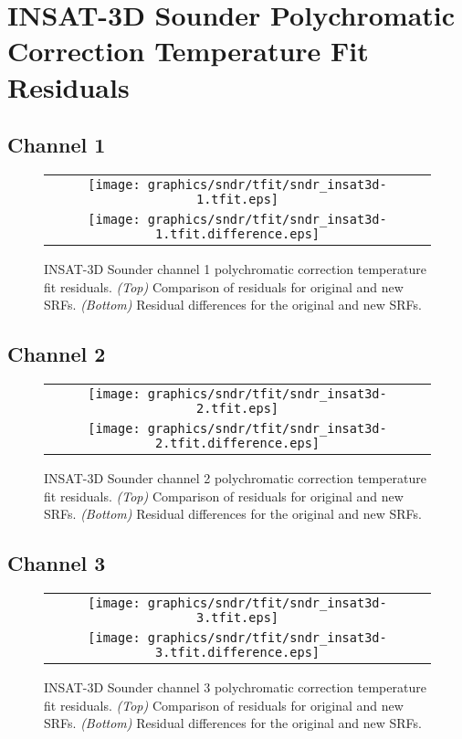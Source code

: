 \section{INSAT-3D Sounder Polychromatic Correction Temperature Fit Residuals}
\label{app.sndr_tfit_data_plots}

\subsection{Channel 1}
\begin{figure}[H]
  \label{fig:sndr_ch1_tfit}
  \centering
  \begin{tabular}{c}
    \texttt{[image: graphics/sndr/tfit/sndr\_insat3d-1.tfit.eps]} \\
    \texttt{[image: graphics/sndr/tfit/sndr\_insat3d-1.tfit.difference.eps]}
  \end{tabular}
  \caption{INSAT-3D Sounder channel 1 polychromatic correction temperature fit residuals. \emph{(Top)} Comparison of residuals for original and new SRFs. \emph{(Bottom)} Residual differences for the original and new SRFs.}
\end{figure}

\subsection{Channel 2}
\begin{figure}[H]
  \label{fig:sndr_ch2_tfit}
  \centering
  \begin{tabular}{c}
    \texttt{[image: graphics/sndr/tfit/sndr\_insat3d-2.tfit.eps]} \\
    \texttt{[image: graphics/sndr/tfit/sndr\_insat3d-2.tfit.difference.eps]}
  \end{tabular}
  \caption{INSAT-3D Sounder channel 2 polychromatic correction temperature fit residuals. \emph{(Top)} Comparison of residuals for original and new SRFs. \emph{(Bottom)} Residual differences for the original and new SRFs.}
\end{figure}

\subsection{Channel 3}
\begin{figure}[H]
  \label{fig:sndr_ch3_tfit}
  \centering
  \begin{tabular}{c}
    \texttt{[image: graphics/sndr/tfit/sndr\_insat3d-3.tfit.eps]} \\
    \texttt{[image: graphics/sndr/tfit/sndr\_insat3d-3.tfit.difference.eps]}
  \end{tabular}
  \caption{INSAT-3D Sounder channel 3 polychromatic correction temperature fit residuals. \emph{(Top)} Comparison of residuals for original and new SRFs. \emph{(Bottom)} Residual differences for the original and new SRFs.}
\end{figure}

